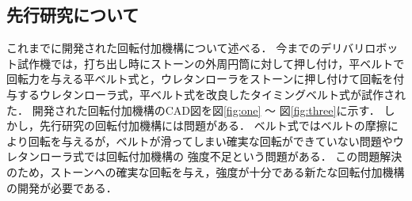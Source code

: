 \documentclass{classes/sice-si}
\begin{document}
\subsection{先行研究について}
これまでに開発された回転付加機構について述べる．
今までのデリバリロボット試作機では，打ち出し時にストーンの外周円筒に対して押し付け，平ベルトで回転力を与える平ベルト式\cite{ref:sankou}と，ウレタンローラをストーンに押し付けて回転を付与するウレタンローラ式，平ベルト式を改良したタイミングベルト式が試作された．
開発された回転付加機構のCAD図を図\ref{fig:one} ～ 図\ref{fig:three}に示す．
しかし，先行研究の回転付加機構には問題がある．
ベルト式ではベルトの摩擦により回転を与えるが，ベルトが滑ってしまい確実な回転ができていない問題やウレタンローラ式では回転付加機構の
強度不足という問題がある．
この問題解決のため，ストーンへの確実な回転を与え，強度が十分である新たな回転付加機構の開発が必要である．
\end{document}

